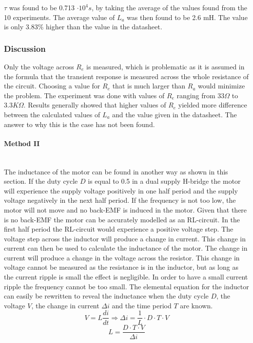 $\tau$ was found to be 0.713 $\cdot 10^4 s$, by taking the average of the values found from the 10 experiments.
The average value of $L_a$ was then found to be 2.6 mH. The value is only $3.83\%$ higher than the value in the datasheet.

\subsubsection{Discussion}
Only the voltage across $R_e$ is measured, which is problematic as it is assumed in the formula that the transient response is measured across the whole resistance of the circuit. Choosing a value for $R_e$ that is much larger than $R_a$ would minimize the problem.
The experiment was done with values of $R_e$ ranging from $33\Omega$ to $3.3K\Omega$.
Results generally showed that higher values of $R_e$ yielded more difference between the calculated values of $L_a$ and the value given in the datasheet.	
The answer to why this is the case has not been found.


\paragraph{Method II}~\\
The inductance of the motor can be found in another way as shown in this section. 
If the duty cycle $D$ is equal to 0.5 in a dual supply H-bridge the motor will experience the supply voltage positively in one half period and the supply voltage negatively in the next half period.
If the frequency is not too low, the motor will not move and no back-EMF is induced in the motor. 
Given that there is no back-EMF the motor can be accurately modelled as an RL-circuit.  
In the first half period the RL-circuit would experience a positive voltage step. 
The voltage step across the inductor will produce a change in current.
This change in current can then be used to calculate the inductance of the motor.
The change in current will produce a change in the voltage across the resistor.
This change in voltage cannot be measured as the resistance is in the inductor, but as long as the current ripple is small the effect is negligible. 
In order to have a small current ripple the frequency cannot be too small.   
The elemental equation for the inductor can easily be rewritten to reveal the inductance when the duty cycle $D$, the voltage $V$, the change in current $\Delta i$ and the time period $T$ are known. 
$$V = L \frac{di}{dt} \Rightarrow \Delta i = \frac{1}{L} \cdot D \cdot T \cdot V $$
$$L = \frac{D \cdot T \cdot V}{\Delta i}$$



